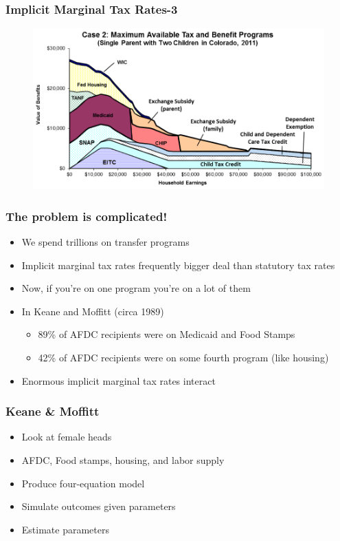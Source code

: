 \documentclass{beamer}
\begin{document}
\begin{frame}
\frametitle[alignment=center]{Implicit Marginal Tax Rates-3}
\begin{figure}
\centering
\includegraphics[scale=0.35]{ITR_3}
\end{figure}
\end{frame}

\begin{frame}
\frametitle[alignment=center]{The problem is complicated!}
\begin{itemize}
\item We spend trillions on transfer programs
\bigskip
\item Implicit marginal tax rates frequently bigger deal than statutory tax rates
\bigskip
\item Now, if you're on one program you're on a lot of them
\bigskip
\item In Keane and Moffitt (circa 1989)
\begin{itemize}
\item  89\% of AFDC recipients were on Medicaid and Food Stamps
\item 42\% of AFDC recipients were on some fourth program (like housing)
\end{itemize} 
\item Enormous implicit marginal tax rates interact
\end{itemize}
\end{frame}

\begin{frame}
\frametitle[alignment=center]{Keane \& Moffitt}
\begin{itemize}
\item Look at female heads
\bigskip
\item AFDC, Food stamps, housing, and labor supply
\bigskip
\item Produce four-equation model
\bigskip
\item Simulate outcomes given parameters
\bigskip
\item Estimate parameters
\end{itemize}
\end{frame}
\end{document}
